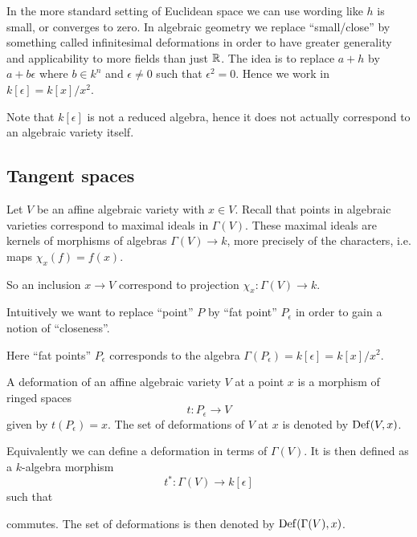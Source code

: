 In the more standard setting of Euclidean space we can use wording like $h$ is small, or converges to zero. In algebraic geometry we replace ``small/close'' by something called infinitesimal deformations in order to have greater generality and applicability to more fields than just $\mathbb{R}$. The idea is to replace $a+h$ by $a+b\epsilon$ where $b\in k^n$ and $\epsilon \neq 0$ such that $\epsilon^2 = 0$. Hence we work in $k[\epsilon] = k[x]/x^2$. 

Note that $k[\epsilon]$ is not a reduced algebra, hence it does not actually correspond to an algebraic variety itself. 

\subsection{Tangent spaces}

Let $V$ be an affine algebraic variety with $x\in V$. Recall that points in algebraic varieties correspond to maximal ideals in $\Gamma(V)$. These maximal ideals are kernels of morphisms of algebras $\Gamma(V)\longrightarrow k$, more precisely of the characters, i.e. maps $\chi_x(f) = f(x)$. 

So an inclusion $x\rightarrow V$ correspond to projection $\chi_x\colon \Gamma(V)\longrightarrow k$. 

Intuitively we want to replace ``point'' $P$ by ``fat point'' $P_\epsilon$ in order to gain a notion of ``closeness''.

Here ``fat points'' $P_\epsilon$ corresponds to the algebra $\Gamma(P_\epsilon) = k[\epsilon] = k[x]/x^2$. 

\begin{definition}[Deformation]
A deformation of an affine algebraic variety $V$ at a point $x$ is a morphism of ringed spaces 
\begin{equation*}
    t\colon P_\epsilon\longrightarrow V
\end{equation*}
given by $t(P_\epsilon) = x$. The set of deformations of $V$ at $x$ is denoted by $\operatorname{Def}(V, x)$. 
\end{definition}

Equivalently we can define a deformation in terms of $\Gamma(V)$. It is then defined as a $k$-algebra morphism 
\begin{equation*}
    t^*\colon \Gamma(V)\longrightarrow k[\epsilon]
\end{equation*}
such that 
\begin{center}
\end{center}
commutes. The set of deformations is then denoted by $\operatorname{Def}(\Gamma(V), x)$. 

